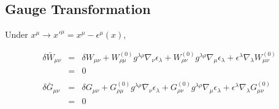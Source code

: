 \documentclass[10pt,letterpaper]{article}
\numberwithin{equation}{section}
\begin{document}
\subsection{Gauge Transformation}
Under $x^\mu \to x'^{\mu} = x^\mu -\epsilon^\mu(x)$,

\begin{eqnarray}
\delta \bar W_{\mu\nu} &=& \delta W_{\mu\nu} + W^{(0)}_{\rho\mu}g^{\lambda\rho} \nabla_\nu \epsilon_\lambda + W^{(0)}_{\rho\nu}g^{\lambda\rho} \nabla_\mu \epsilon_\lambda + \epsilon^\lambda\nabla_\lambda W^{(0)}_{\mu\nu} 
\nonumber\\
&=&0
\nonumber\\\nonumber\\
\delta \bar G_{\mu\nu} &=& \delta G_{\mu\nu} + G^{(0)}_{\rho\mu}g^{\lambda\rho} \nabla_\nu \epsilon_\lambda + G^{(0)}_{\rho\nu}g^{\lambda\rho} \nabla_\mu \epsilon_\lambda + \epsilon^\lambda\nabla_\lambda G^{(0)}_{\mu\nu} 
\nonumber\\
&=&0
\end{eqnarray}

%
%
\end{document}
